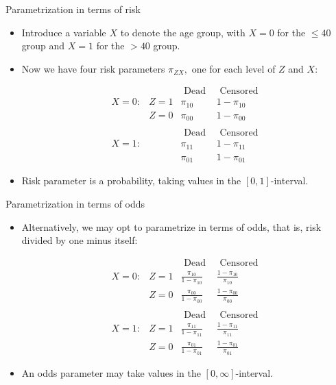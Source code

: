 \documentclass[10pt]{beamer}\usepackage[]{graphicx}\usepackage[]{color}
\begin{document}
\begin{frame}{Parametrization in terms of risk}
	\begin{itemize}
		\item Introduce a variable $X$ to denote the age group, with $X=0$ for the $\leq 40$ group and $X=1$ for the $>40$ group.
		\item Now we have four risk parameters $\pi_{Z X},$ one for each level of $Z$ and $X:$
		
		$$
		\begin{array}{llcc} 
			     &      & \text { Dead } & \text { Censored } \\
			X=0: & Z=1 & \pi_{10} & 1-\pi_{10} \\
			     & Z=0 & \pi_{00} & 1-\pi_{00} \\
			        & & & \\
			     &  & \text { Dead } & \text { Censored } \\
			X=1:& & \pi_{11}      & 1-\pi_{11} \\
			 & & \pi_{01} & 1-\pi_{01}
		\end{array}
		$$
		\item Risk parameter is a probability, taking values in the $[0, 1]$-interval.
	\end{itemize}
\end{frame}



\begin{frame}{Parametrization in terms of odds}
	\begin{itemize}
		\item Alternatively, we may opt to parametrize in terms of odds,
		that is, risk divided by one minus itself:
		
				$$
		\begin{array}{llcc} 
		&      & \text { Dead } & \text { Censored } \\
		X=0: & Z=1 & \frac{\pi_{10}}{1-\pi_{10}} & \frac{1-\pi_{10}}{\pi_{10}} \\
		& Z=0 & \frac{\pi_{00}}{1- \pi_{00}} & \frac{1-\pi_{00}}{\pi_{00}} \\
		& & & \\
		&  & \text { Dead } & \text { Censored } \\
		X=1:&  Z=1 & \frac{\pi_{11}}{1-\pi_{11}}      & \frac{1-\pi_{11}}{\pi_{11}} \\
		    &  Z=0    & \frac{\pi_{01}}{1-\pi_{01}} & \frac{1-\pi_{01}}{\pi_{01}}
		\end{array}
		$$
		
		\item An odds parameter may take values in the $[0, \infty]$-interval.
	\end{itemize}
\end{frame}
\end{document}
